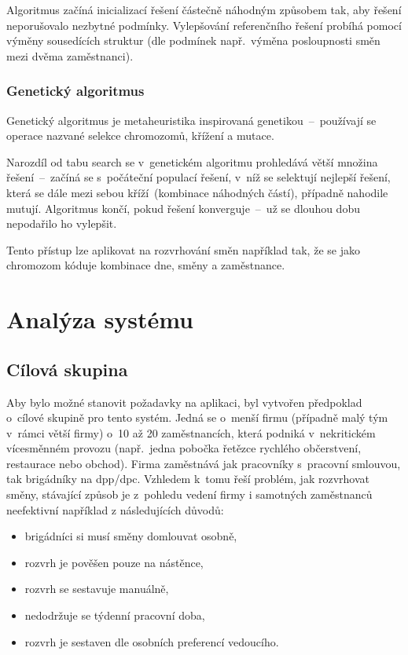 \documentclass[twoside]{ctuthesis}
\begin{document}
 Algoritmus začíná inicializací řešení částečně náhodným způsobem tak, aby řešení neporušovalo nezbytné podmínky. Vylepšování referenčního řešení probíhá pomocí výměny sousedících struktur (dle podmínek např.~výměna posloupnosti směn mezi dvěma zaměstnanci). \cite{ramli2020tabu}

\subsection{Genetický algoritmus}

Genetický algoritmus je metaheuristika inspirovaná genetikou~--~používají se operace nazvané selekce chromozomů, křížení a mutace.

Narozdíl od tabu search se v~genetickém algoritmu prohledává větší množina řešení~–~začíná se s~počáteční populací řešení, v~níž se selektují nejlepší řešení, která se dále mezi sebou kříží~(kombinace náhodných částí), případně nahodile mutují. Algoritmus končí, pokud řešení konverguje~–~už se dlouhou dobu nepodařilo ho vylepšit. \cite{mallawaarachchi2017introduction}

Tento přístup lze aplikovat na rozvrhování směn například tak, že se jako chromozom kóduje kombinace dne, směny a zaměstnance. \cite{maenhout2011evolutionary}


\chapter{Analýza systému}

\section{Cílová skupina}
Aby bylo možné stanovit požadavky na aplikaci, byl vytvořen předpoklad o~cílové skupině pro tento systém. Jedná se o~menší firmu (případně malý tým v~rámci větší firmy) o~10 až 20 zaměstnancích, která podniká v~nekritickém vícesměnném provozu (např.~jedna pobočka řetězce rychlého občerstvení, restaurace nebo obchod). Firma zaměstnává jak pracovníky s~pracovní smlouvou, tak brigádníky na \acrshort{dpp}/\acrshort{dpc}. Vzhledem k~tomu řeší problém, jak rozvrhovat směny, stávající způsob je z~pohledu vedení firmy i samotných zaměstnanců neefektivní například z následujících důvodů:
\begin{itemize}
	\item brigádníci si musí směny domlouvat osobně,
	\item rozvrh je pověšen pouze na nástěnce,
	\item rozvrh se sestavuje manuálně,
	\item nedodržuje se týdenní pracovní doba,
	\item rozvrh je sestaven dle osobních preferencí vedoucího.
\end{itemize}
\end{document}

